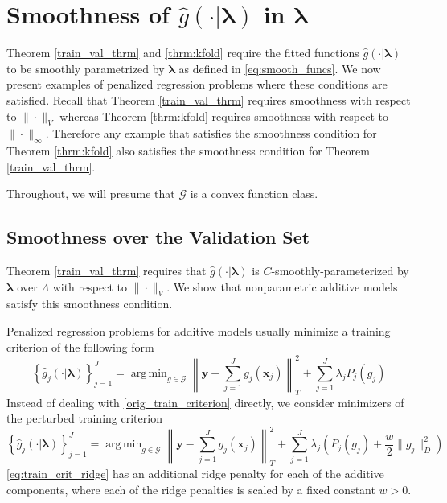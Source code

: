 \documentclass[12pt]{article}
\DeclareMathOperator*{\argmin}{arg\,min}
\begin{document}
\section{Smoothness of $\hat{g}(\cdot | \boldsymbol{\lambda})$ in $\boldsymbol \lambda$}
\label{sec:entropy}

Theorem \ref{train_val_thrm} and \ref{thrm:kfold} require the fitted functions $\hat{g}(\cdot | \boldsymbol{\lambda})$ to be smoothly parametrized by $\boldsymbol{\lambda}$ as defined in \eqref{eq:smooth_funcs}. We now present examples of penalized regression problems where these conditions are satisfied. Recall that Theorem \ref{train_val_thrm} requires smoothness with respect to $\|\cdot \|_V$ whereas Theorem \ref{thrm:kfold} requires smoothness with respect to $\|\cdot\|_\infty$. Therefore any example that satisfies the smoothness condition for Theorem \ref{thrm:kfold} also satisfies the smoothness condition for Theorem \ref{train_val_thrm}.

Throughout, we will presume that $\mathcal{G}$ is a convex function class.

\subsection{Smoothness over the Validation Set}
\label{sec:smoothness_validation}

Theorem \ref{train_val_thrm} requires that $\hat{g}(\cdot | \boldsymbol{\lambda})$ is $C$-smoothly-parameterized by $\boldsymbol{\lambda}$ over $\Lambda$ with respect to $\| \cdot \|_V$. We show that nonparametric additive models satisfy this smoothness condition.

Penalized regression problems for additive models usually minimize a training criterion of the following form
\begin{equation}
\label{orig_train_criterion}
\left\{ \hat{g}_j(\cdot | \boldsymbol \lambda) \right \}_{j=1}^J = \argmin_{g\in \mathcal{G}} \left \| \boldsymbol y -  \sum_{j=1}^J g_j(\boldsymbol x_j) \right \|^2_T + \sum_{j=1}^J \lambda_j P_j(g_j)
\end{equation}
Instead of dealing with \eqref{orig_train_criterion} directly, we consider minimizers of the perturbed training criterion
\begin{equation}
\label{eq:train_crit_ridge}
\left\{ \hat{g}_j(\cdot | \boldsymbol \lambda) \right \}_{j=1}^J = \argmin_{g\in \mathcal{G}} \left \| \boldsymbol y -  \sum_{j=1}^J g_j(\boldsymbol x_j) \right \|^2_T + \sum_{j=1}^J \lambda_j \left ( P_j(g_j) + \frac{w}{2} \| g_j \|^2_D \right )
\end{equation}
\eqref{eq:train_crit_ridge} has an additional ridge penalty for each of the additive components, where each of the ridge penalties is scaled by a fixed constant $w > 0$. 
\end{document}
